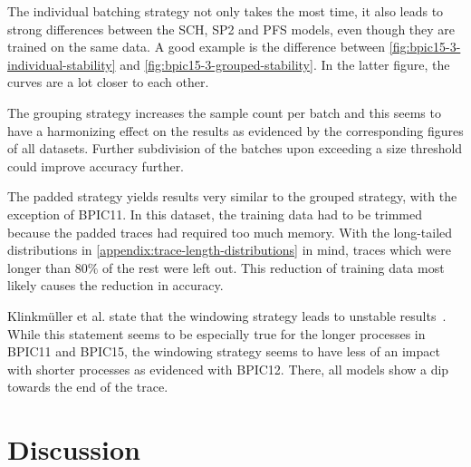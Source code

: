 The individual batching strategy not only takes the most time, it also leads to strong differences between the SCH, SP2 and PFS models, even though they are trained on the same data. A good example is the difference between \autoref{fig:bpic15-3-individual-stability} and \autoref{fig:bpic15-3-grouped-stability}. In the latter figure, the curves are a lot closer to each other.

The grouping strategy increases the sample count per batch and this seems to have a harmonizing effect on the results as evidenced by the corresponding figures of all datasets. Further subdivision of the batches upon exceeding a size threshold could improve accuracy further.

The padded strategy yields results very similar to the grouped strategy, with the exception of BPIC11. In this dataset, the training data had to be trimmed because the padded traces had required too much memory. With the long-tailed distributions in \autoref{appendix:trace-length-distributions} in mind, traces which were longer than $80\%$ of the rest were left out. This reduction of training data most likely causes the reduction in accuracy.

Klinkmüller et al. state that the windowing strategy leads to unstable results~\cite{klinkmuller2018reliablemonitoring}. While this statement seems to be especially true for the longer processes in BPIC11 and BPIC15, the windowing strategy seems to have less of an impact with shorter processes as evidenced with BPIC12. There, all models show a dip towards the end of the trace.

\section{Discussion}\label{sec:eval:discussion}
